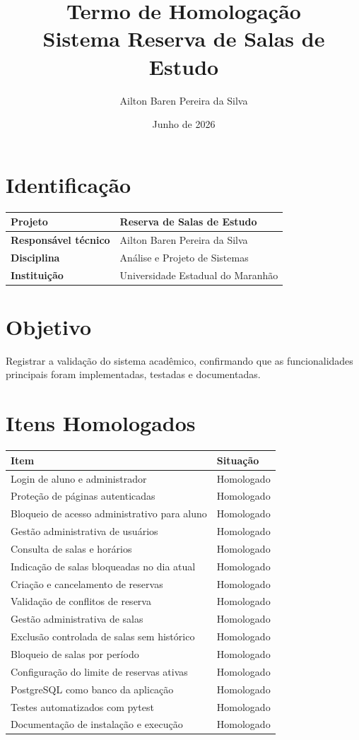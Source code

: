 \documentclass[12pt,a4paper]{article}
\title{\textbf{Termo de Homologação}\\Sistema Reserva de Salas de Estudo}
\author{Ailton Baren Pereira da Silva}
\date{Junho de 2026}
\begin{document}
\maketitle

\section{Identificação}
\begin{longtable}{|p{5cm}|p{10cm}|}
\hline
\textbf{Projeto} & Reserva de Salas de Estudo \\ \hline
\textbf{Responsável técnico} & Ailton Baren Pereira da Silva \\ \hline
\textbf{Disciplina} & Análise e Projeto de Sistemas \\ \hline
\textbf{Instituição} & Universidade Estadual do Maranhão \\ \hline
\end{longtable}

\section{Objetivo}
Registrar a validação do sistema acadêmico, confirmando que as funcionalidades principais foram implementadas, testadas e documentadas.

\section{Itens Homologados}
\begin{longtable}{|p{10cm}|p{4cm}|}
\hline
\textbf{Item} & \textbf{Situação} \\ \hline
Login de aluno e administrador & Homologado \\ \hline
Proteção de páginas autenticadas & Homologado \\ \hline
Bloqueio de acesso administrativo para aluno & Homologado \\ \hline
Gestão administrativa de usuários & Homologado \\ \hline
Consulta de salas e horários & Homologado \\ \hline
Indicação de salas bloqueadas no dia atual & Homologado \\ \hline
Criação e cancelamento de reservas & Homologado \\ \hline
Validação de conflitos de reserva & Homologado \\ \hline
Gestão administrativa de salas & Homologado \\ \hline
Exclusão controlada de salas sem histórico & Homologado \\ \hline
Bloqueio de salas por período & Homologado \\ \hline
Configuração do limite de reservas ativas & Homologado \\ \hline
PostgreSQL como banco da aplicação & Homologado \\ \hline
Testes automatizados com pytest & Homologado \\ \hline
Documentação de instalação e execução & Homologado \\ \hline
\end{longtable}
\end{document}
